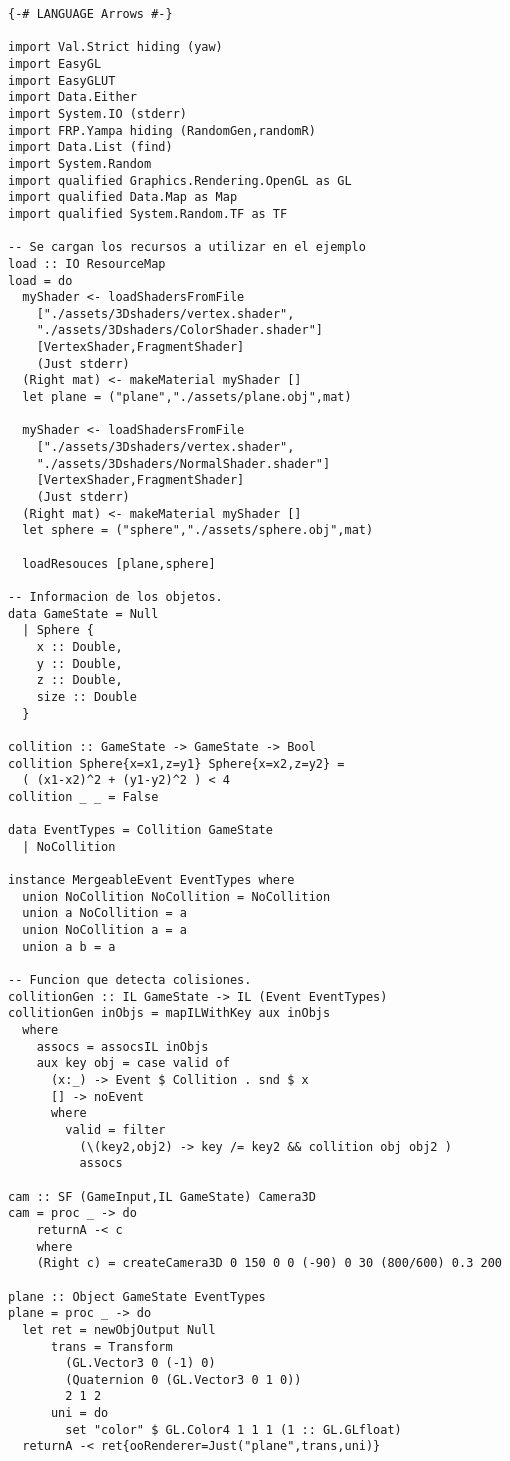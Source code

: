 \documentclass{standalone}
\begin{document}
\begin{lstlisting}
{-# LANGUAGE Arrows #-}

import Val.Strict hiding (yaw)
import EasyGL
import EasyGLUT
import Data.Either
import System.IO (stderr)
import FRP.Yampa hiding (RandomGen,randomR)
import Data.List (find)
import System.Random
import qualified Graphics.Rendering.OpenGL as GL
import qualified Data.Map as Map
import qualified System.Random.TF as TF

-- Se cargan los recursos a utilizar en el ejemplo
load :: IO ResourceMap
load = do
  myShader <- loadShadersFromFile
    ["./assets/3Dshaders/vertex.shader",
    "./assets/3Dshaders/ColorShader.shader"]
    [VertexShader,FragmentShader]
    (Just stderr)
  (Right mat) <- makeMaterial myShader []
  let plane = ("plane","./assets/plane.obj",mat)

  myShader <- loadShadersFromFile
    ["./assets/3Dshaders/vertex.shader",
    "./assets/3Dshaders/NormalShader.shader"]
    [VertexShader,FragmentShader]
    (Just stderr)
  (Right mat) <- makeMaterial myShader []
  let sphere = ("sphere","./assets/sphere.obj",mat)

  loadResouces [plane,sphere]

-- Informacion de los objetos.
data GameState = Null
  | Sphere {
    x :: Double,
    y :: Double,
    z :: Double,
    size :: Double
  }

collition :: GameState -> GameState -> Bool
collition Sphere{x=x1,z=y1} Sphere{x=x2,z=y2} =
  ( (x1-x2)^2 + (y1-y2)^2 ) < 4
collition _ _ = False

data EventTypes = Collition GameState
  | NoCollition

instance MergeableEvent EventTypes where
  union NoCollition NoCollition = NoCollition
  union a NoCollition = a
  union NoCollition a = a
  union a b = a

-- Funcion que detecta colisiones.
collitionGen :: IL GameState -> IL (Event EventTypes)
collitionGen inObjs = mapILWithKey aux inObjs
  where
    assocs = assocsIL inObjs
    aux key obj = case valid of
      (x:_) -> Event $ Collition . snd $ x
      [] -> noEvent
      where
        valid = filter
          (\(key2,obj2) -> key /= key2 && collition obj obj2 )
          assocs

cam :: SF (GameInput,IL GameState) Camera3D
cam = proc _ -> do
    returnA -< c
    where
    (Right c) = createCamera3D 0 150 0 0 (-90) 0 30 (800/600) 0.3 200

plane :: Object GameState EventTypes
plane = proc _ -> do
  let ret = newObjOutput Null
      trans = Transform
        (GL.Vector3 0 (-1) 0)
        (Quaternion 0 (GL.Vector3 0 1 0))
        2 1 2
      uni = do
        set "color" $ GL.Color4 1 1 1 (1 :: GL.GLfloat)
  returnA -< ret{ooRenderer=Just("plane",trans,uni)}


\end{lstlisting}
\end{document}
